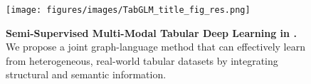 \begin{figure}[t]
        \centering
        \texttt{[image: figures/images/TabGLM\_title\_fig\_res.png]}
        \caption{\textbf{Semi-Supervised Multi-Modal Tabular Deep Learning in \tabglm.} We propose a joint graph-language method that can effectively learn from heterogeneous, real-world tabular datasets by integrating structural and semantic information.}
        \label{fig:title_figure}
\end{figure}



